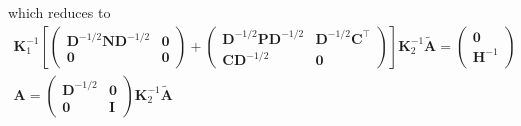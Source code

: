 which reduces to
\begin{subequations}\begin{gather}
\mathbf{K}_1^{-1} 
\left[
\begin{pmatrix}\mathbf{D}^{-1/2}\mathbf{ND}^{-1/2}&\mathbf{0}\\ \mathbf{0}&\mathbf{0}\end{pmatrix}
+
\begin{pmatrix}\mathbf{D}^{-1/2}\mathbf{PD}^{-1/2}&\mathbf{D}^{-1/2}\mathbf{C}^\top \\ \mathbf{CD}^{-1/2}&\mathbf{0}\end{pmatrix}
\right]
\mathbf{K}_2^{-1} \mathbf{\widetilde{A}} = 
\begin{pmatrix}\mathbf{0}\\ \mathbf{H}^{-1}\end{pmatrix}\\
\mathbf{A} = \begin{pmatrix}\mathbf{D}^{-1/2}&\mathbf{0}\\ \mathbf{0}&\mathbf{I}\end{pmatrix}\mathbf{K}_2^{-1}\mathbf{\widetilde{A}}
\end{gather}\end{subequations}

